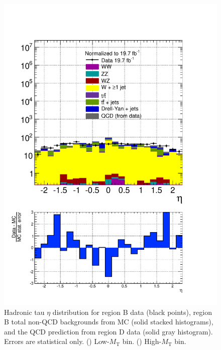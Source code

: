 \begin{figure}[hbtp]
\begin{center}
    \includegraphics[width=\cmsFigWidth]{figures/dataVsMCQCD_tauHadEta_highMT_v87}
    \caption{Hadronic tau $\eta$ distribution for region B data (black points), region B total non-QCD backgrounds from MC (solid stacked histograms), and the QCD prediction from region D data (solid gray histogram).  Errors are statistical only. (\cmsLeft) Low-$M_{\text{T}}$ bin. (\cmsRight) High-$M_{\text{T}}$ bin.}
    \label{fig:regB-data-MC-tauHadEta}
  \end{center}
\end{figure}

